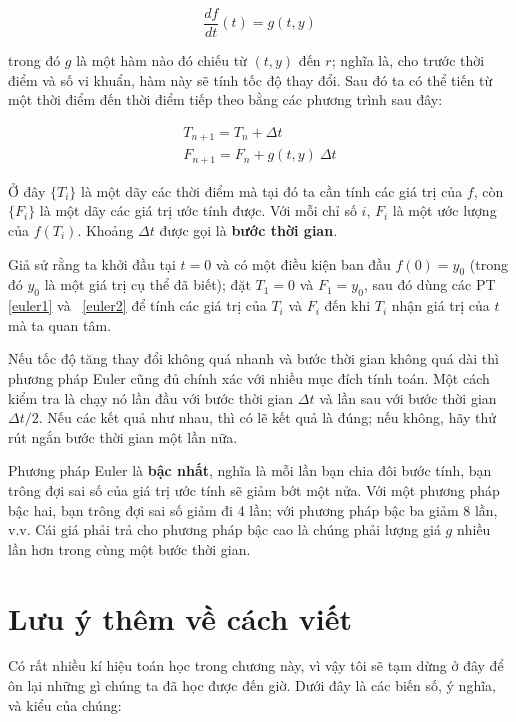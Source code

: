 \documentclass[12pt]{book}
\begin{document}
\[ \frac{df}{dt}(t) = g(t, y) \]

\noindent trong đó $g$ là một hàm nào đó chiếu từ $(t, y)$ đến $r$; nghĩa là,
cho trước thời điểm và số vi khuẩn, hàm này sẽ tính tốc độ thay đổi.
Sau đó ta có thể tiến từ một thời điểm đến thời điểm tiếp theo bằng
các phương trình sau đây:

\begin{eqnarray}
\label{euler1}
T_{n+1} = T_n + \Delta t           \\
\label{euler2}
F_{n+1} = F_n + g(t,y)~\Delta t
\end{eqnarray}

Ở đây $\{T_i\}$ là một dãy các thời điểm mà tại đó ta cần tính các
giá trị của $f$, còn $\{F_i\}$ là một dãy các giá trị ước tính được. Với
mỗi chỉ số $i$, $F_i$ là một ước lượng của $f(T_i)$. Khoảng $\Delta t$
được gọi là {\bf bước thời gian}.

Giả sử rằng ta khởi đầu tại $t=0$ và có một điều kiện ban đầu
$f(0) = y_0$ (trong đó $y_0$ là một giá trị cụ thể đã biết); đặt
$T_1 = 0$ và $F_1 = y_0$, sau đó dùng các PT~ \ref{euler1} 
và~ \ref{euler2} để tính các giá trị của $T_i$ và $F_i$ đến khi $T_i$
nhận giá trị của $t$ mà ta quan tâm.

Nếu tốc độ tăng thay đổi không quá nhanh và bước thời gian không 
quá dài thì phương pháp Euler cũng đủ chính xác với nhiều mục đích
tính toán. Một cách kiểm tra là chạy nó lần đầu với bước thời gian 
$\Delta t$ và lần sau với bước thời gian $\Delta t/2$. Nếu các kết quả
như nhau, thì có lẽ kết quả là đúng; nếu không, hãy thử rút ngắn
bước thời gian một lần nữa.

Phương pháp Euler là {\bf bậc nhất}, nghĩa là mỗi lần bạn chia đôi
bước tính, bạn trông đợi sai số của giá trị ước tính sẽ giảm bớt 
một nửa. Với một phương pháp bậc hai, bạn trông đợi sai số giảm
đi 4 lần; với phương pháp bậc ba giảm 8 lần, v.v. Cái giá phải trả
cho phương pháp bậc cao là chúng phải lượng giá $g$ nhiều lần hơn
trong cùng một bước thời gian.


\section{Lưu ý thêm về cách viết}

Có rất nhiều kí hiệu toán học trong chương này, vì vậy tôi sẽ tạm dừng
ở đây để ôn lại những gì chúng ta đã học được đến giờ. Dưới đây là
các biến số, ý nghĩa, và kiểu của chúng:
\end{document}
